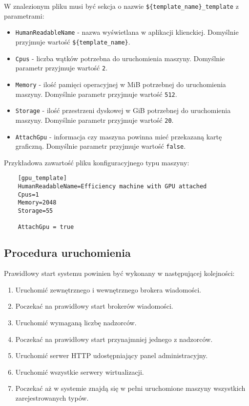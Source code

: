 \documentclass[../opis-rozwiazania.tex]{subfiles}
\begin{document}
W znalezionym pliku musi być sekcja o nazwie \texttt{\$\{template\_name\}\_template} z parametrami:
\begin{itemize}
  \item \texttt{HumanReadableName} - nazwa wyświetlana w aplikacji klienckiej. Domyślnie przyjmuje wartość \texttt{\$\{template\_name\}}.
  \item \texttt{Cpus} - liczba wątków potrzebna do uruchomienia maszyny. Domyślnie parametr przyjmuje wartość \texttt{2}.
  \item \texttt{Memory} - ilość pamięci operacyjnej w MiB potrzebnej do uruchomienia maszyny. Domyślnie parametr przyjmuje wartość \texttt{512}.
  \item \texttt{Storage} - ilość przestrzeni dyskowej w GiB potrzebnej do uruchomienia maszyny. Domyślnie parametr przyjmuje wartość \texttt{20}.
  \item \texttt{AttachGpu} - informacja czy maszyna powinna mieć przekazaną kartę graficzną. Domyślnie parametr przyjmuje wartość \texttt{false}.
\end{itemize}

Przykładowa zawartość pliku konfiguracyjnego typu maszyny:

\begin{verbatim}
	[gpu_template]
	HumanReadableName=Efficiency machine with GPU attached
	Cpus=1
	Memory=2048
	Storage=55

	AttachGpu = true
\end{verbatim}

\subsection{Procedura uruchomienia}
\label{system_startup.procedure}
Prawidłowy start systemu powinien być wykonany w następującej kolejności:
\begin{enumerate}
  \item Uruchomić zewnętrznego i wewnętrznego brokera wiadomości.
  \item Poczekać na prawidłowy start brokerów wiadomości.
  \item Uruchomić wymaganą liczbę nadzorców.
  \item Poczekać na prawidłowy start przynajmniej jednego z nadzorców.
  \item Uruchomić serwer HTTP udostępniający panel administracyjny.
  \item Uruchomić wszystkie serwery wirtualizacji.
  \item Poczekać aż w systemie znajdą się w pełni uruchomione maszyny wszystkich zarejestrowanych typów.
\end{enumerate}
\end{document}
